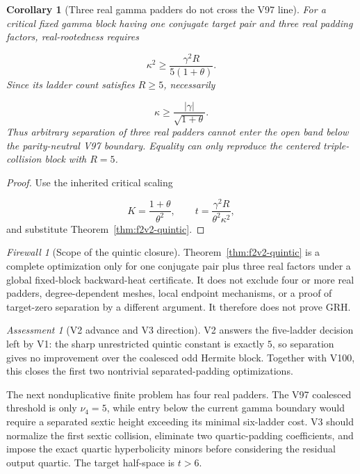 \documentclass[11pt]{article}
\newtheorem{corollary}[theorem]{Corollary}
\theoremstyle{definition}
\theoremstyle{remark}
\newtheorem{assessment}[theorem]{Assessment}
\newtheorem{firewall}[theorem]{Firewall}
\begin{document}
\begin{corollary}[Three real gamma padders do not cross the V97 line]
\label{cor:f2v2-gamma}
For a critical fixed gamma block having one conjugate target pair and
three real padding factors, real-rootedness requires

\[
 \kappa^2\ge
 \frac{\gamma^2R}{5(1+\theta)}.
 \tag{N2.22}
\]
Since its ladder count satisfies \(R\ge5\), necessarily

\[
 \boxed{
 \kappa\ge\frac{|\gamma|}{\sqrt{1+\theta}}.}
 \tag{N2.23}
\]
Thus arbitrary separation of three real padders cannot enter the open
band below the parity-neutral V97 boundary.  Equality can only reproduce
the centered triple-collision block with \(R=5\).
\end{corollary}

\begin{proof}
Use the inherited critical scaling

\[
 K=\frac{1+\theta}{\theta^2},
 \qquad
 t=\frac{\gamma^2R}{\theta^2\kappa^2},
 \tag{N2.24}
\]
and substitute Theorem~\ref{thm:f2v2-quintic}.
\end{proof}

\begin{firewall}[Scope of the quintic closure]
Theorem~\ref{thm:f2v2-quintic} is a complete optimization only for one
conjugate pair plus three real factors under a global fixed-block
backward-heat certificate.  It does not exclude four or more real
padders, degree-dependent meshes, local endpoint mechanisms, or a proof
of target-zero separation by a different argument.  It therefore does
not prove GRH.
\end{firewall}

\begin{assessment}[V2 advance and V3 direction]
V2 answers the five-ladder decision left by V1: the sharp unrestricted
quintic constant is exactly \(5\), so separation gives no improvement
over the coalesced odd Hermite block.  Together with V100, this closes
the first two nontrivial separated-padding optimizations.

The next nonduplicative finite problem has four real padders.  The V97
coalesced threshold is only \(\nu_4=5\), while entry below the current
gamma boundary would require a separated sextic height exceeding its
minimal six-ladder cost.  V3 should normalize the first sextic collision,
eliminate two quartic-padding coefficients, and impose the exact
quartic hyperbolicity minors before considering the residual output
quartic.  The target half-space is \(t>6\).
\end{assessment}
\end{document}
